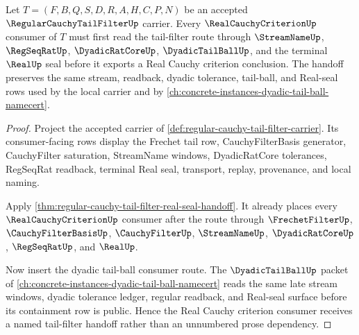 \begin{theorem}
\label{thm:real-cauchy-criterion-tail-filter-handoff}
Let $T=(F,B,Q,S,D,R,A,H,C,P,N)$ be an accepted $\RegularCauchyTailFilterUp$ carrier. Every $\RealCauchyCriterionUp$ consumer of $T$ must first read the tail-filter route through $\StreamNameUp$, $\RegSeqRatUp$, $\DyadicRatCoreUp$, $\DyadicTailBallUp$, and the terminal $\RealUp$ seal before it exports a Real Cauchy criterion conclusion. The handoff preserves the same stream, readback, dyadic tolerance, tail-ball, and Real-seal rows used by the local carrier and by \autoref{ch:concrete-instances-dyadic-tail-ball-namecert}.
\end{theorem}
\begin{proof}
Project the accepted carrier of \autoref{def:regular-cauchy-tail-filter-carrier}. Its consumer-facing rows display the Frechet tail row, CauchyFilterBasis generator, CauchyFilter saturation, StreamName windows, DyadicRatCore tolerances, RegSeqRat readback, terminal Real seal, transport, replay, provenance, and local naming.

Apply \autoref{thm:regular-cauchy-tail-filter-real-seal-handoff}. It already places every $\RealCauchyCriterionUp$ consumer after the route through $\FrechetFilterUp$, $\CauchyFilterBasisUp$, $\CauchyFilterUp$, $\StreamNameUp$, $\DyadicRatCoreUp$, $\RegSeqRatUp$, and $\RealUp$.

Now insert the dyadic tail-ball consumer route. The $\DyadicTailBallUp$ packet of \autoref{ch:concrete-instances-dyadic-tail-ball-namecert} reads the same late stream windows, dyadic tolerance ledger, regular readback, and Real-seal surface before its containment row is public. Hence the Real Cauchy criterion consumer receives a named tail-filter handoff rather than an unnumbered prose dependency.
\end{proof}

